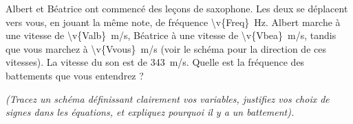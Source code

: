
Albert et Béatrice ont commencé des leçons de saxophone. Les deux se déplacent vers vous, en jouant la même note, de fréquence \qty{\v{Freq}}{Hz}. Albert marche à une vitesse de \qty{\v{Valb}}{m/s}, Béatrice à une vitesse de \qty{\v{Vbea}}{m/s}, tandis que vous marchez à \qty{\v{Vvous}}{m/s} (voir le schéma pour la direction de ces vitesses). La vitesse du son est de \qty{343}{m/s}. Quelle est la fréquence des battements que vous entendrez ?

\textit{(Tracez un schéma définissant clairement vos variables, justifiez vos choix de signes dans les équations, et expliquez pourquoi il y a un battement).}

\vspace{0.8cm}
\begin{center}
\end{center}
\vspace{0.8cm}